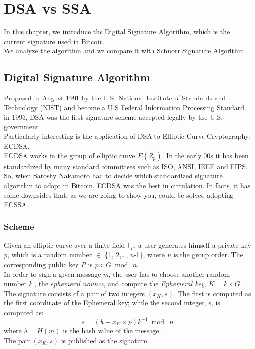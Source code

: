 \chapter{DSA vs SSA}
\label{capitolo5}

In this chapter, we introduce the Digital Signature Algorithm, which is the current signature used in Bitcoin. \\
We analyze the algorithm and we compare it with Schnorr Signature Algorithm.



\section{Digital Signature Algorithm}
Proposed in August 1991 by the U.S. National Institute of Standards and Technology (NIST) and become a U.S Federal Information Processing Standard in 1993, DSA was the first signature scheme  accepted legally by the U.S. government \cite{ECDSA}.\\
Particularly interesting is the application of DSA to Elliptic Curve Cryptography: ECDSA.\\
ECDSA works in the group of elliptic curve $E(Z_{p})$. In the early 00s it has been standardized by many standard committees such as ISO, ANSI, IEEE and FIPS. So, when Satoshy Nakamoto had to decide which standardized signature algorithm to adopt in Bitcoin, ECDSA was the best in circulation. In facts, it has some downsides that, as we are going to show you, could be solved adopting ECSSA.
\subsection{Scheme}
Given an elliptic curve over a finite field $\mathbb{F} _{p}$, a user generates himself a private key \textit{p}, which is a random number $\in$ \{1, 2,\dots, \textit{n}-1\}, where \textit{n} is the group order. The corresponding public key \textit{P} is $\textit{p}\times G\bmod\ n$. \\
In order to sign a given message \textit{m}, the user has to choose another random number \textit{k}%
, the \textit{ephemeral nounce}, and compute the \textit{Ephemeral key}, $\textit{K}= k \times G$.
\\
The signature consists of a pair of two integers $(x_{K}, s)$. The first is computed as the first coordinate of the Ephemeral
key; while the second integer, s, is computed as: 
\begin{equation}
\label{eqn:s2}
s=(h - x_{K} \times p) k^{-1}\bmod\ n
\end{equation}
where $h=H(m)$ is the hash value of the message. \\
The pair $(x_{K},s)$ is published as the signature.\\

